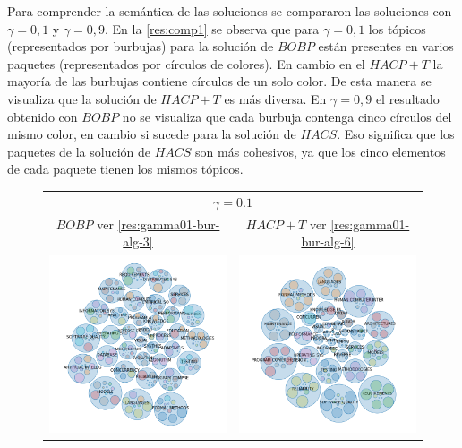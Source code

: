 Para comprender la semántica de las soluciones se compararon las soluciones con $\gamma = 0,1$ y $\gamma = 0,9$. En la \autoref{res:comp1} se observa que para $\gamma = 0,1$ los tópicos (representados por burbujas) para la solución de $BOBP$ están presentes en varios paquetes (representados por círculos de colores). En cambio en el $HACP+T$ la mayoría de las burbujas contiene círculos de un solo color. De esta manera se visualiza que la solución de $HACP+T$ es más diversa. En $\gamma = 0,9$ el resultado obtenido con $BOBP$ no se visualiza que cada burbuja contenga cinco círculos del mismo color, en cambio si sucede para la solución de $HACS$. Eso significa que los paquetes de la solución de $HACS$ son más cohesivos, ya que los cinco elementos de cada paquete tienen los mismos tópicos.

\begin{figure}[H]
	\centering
	\begin{tabular}{cc}
		\multicolumn{2}{c}{$\gamma=0.1$}\vspace{0.5cm}\\
		$BOBP$ ver \autoref{res:gamma01-bur-alg-3} & $HACP+T$ ver \autoref{res:gamma01-bur-alg-6} \\
		\includegraphics[width=0.45\linewidth]{img/gamma-01-burbujas-alg-3.png}&
		\includegraphics[width=0.45\linewidth]{img/gamma-01-burbujas-alg-6.png}\vspace{1cm}\\

\end{tabular}
\end{figure}
